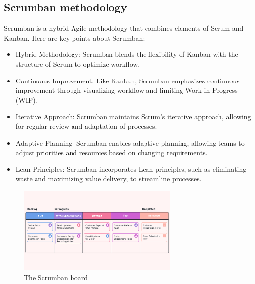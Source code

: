 \subsection{Scrumban methodology}
Scrumban is a hybrid Agile methodology that combines elements of Scrum and Kanban. Here are key points about Scrumban:

\begin{itemize}
    \item Hybrid Methodology: Scrumban blends the flexibility of Kanban with the structure of Scrum to optimize workflow.
    \item Continuous Improvement: Like Kanban, Scrumban emphasizes continuous improvement through visualizing workflow and limiting Work in Progress (WIP).
    \item Iterative Approach: Scrumban maintains Scrum's iterative approach, allowing for regular review and adaptation of processes.
    \item Adaptive Planning: Scrumban enables adaptive planning, allowing teams to adjust priorities and resources based on changing requirements.
    \item Lean Principles: Scrumban incorporates Lean principles, such as eliminating waste and maximizing value delivery, to streamline processes.
\end{itemize}

\begin{figure}[H]
    \centering
    \includegraphics[width=0.7\textwidth]{src/assets/chapters/Scrumban.png}
    \caption{The Scrumban board}
    \label{fig:Scrumban_image}
\end{figure}

